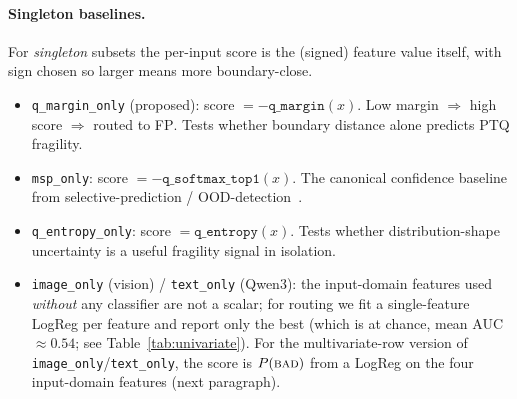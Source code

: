 \documentclass{article}
\newcommand{\fp}{\textsc{FP}\xspace}
\newcommand{\ptq}{\textsc{PTQ}\xspace}
\newcommand{\bad}{\textsc{bad}\xspace}
\begin{document}
\paragraph{Singleton baselines.}
For \emph{singleton} subsets the per-input score is the (signed) feature value itself, with sign chosen so larger means more boundary-close.
\begin{itemize}[leftmargin=*,topsep=2pt,itemsep=0pt]
\item \texttt{q\_margin\_only} (proposed): score $= -\texttt{q\_margin}(x)$. Low margin $\Rightarrow$ high score $\Rightarrow$ routed to \fp{}. Tests whether boundary distance alone predicts \ptq{} fragility.
\item \texttt{msp\_only}: score $= -\texttt{q\_softmax\_top1}(x)$. The canonical confidence baseline from selective-prediction / OOD-detection~\cite{hendrycks2017baseline,geifman2017selective}.
\item \texttt{q\_entropy\_only}: score $= \texttt{q\_entropy}(x)$. Tests whether distribution-shape uncertainty is a useful fragility signal in isolation.
\item \texttt{image\_only} (vision) / \texttt{text\_only} (Qwen3): the input-domain features used \emph{without} any classifier are not a scalar; for routing we fit a single-feature LogReg per feature and report only the best (which is at chance, mean AUC $\approx 0.54$; see Table~\ref{tab:univariate}). For the multivariate-row version of \texttt{image\_only}/\texttt{text\_only}, the score is $P(\bad)$ from a LogReg on the four input-domain features (next paragraph).
\end{itemize}
\end{document}
